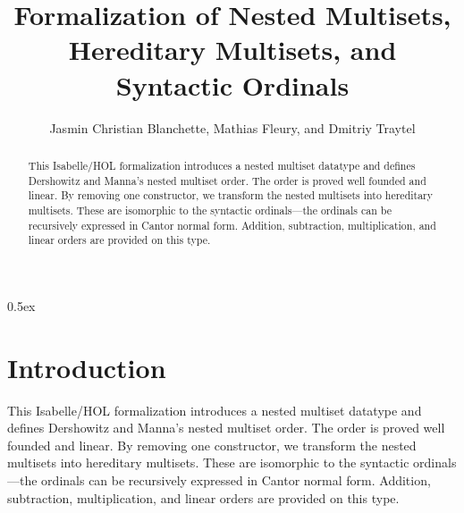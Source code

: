 \documentclass[10pt,a4paper]{article}
\begin{document}
\title{Formalization of Nested Multisets, Hereditary Multisets, and Syntactic Ordinals}
\author{Jasmin Christian Blanchette, Mathias Fleury, and Dmitriy Traytel}

\maketitle

\begin{abstract}
\noindent
This Isabelle/HOL formalization introduces a nested multiset datatype and
defines Dershowitz and Manna's nested multiset order. The order is proved well
founded and linear. By removing one constructor, we transform the nested
multisets into hereditary multisets. These are isomorphic to the syntactic
ordinals---the ordinals can be recursively expressed in Cantor normal form.
Addition, subtraction, multiplication, and linear orders are provided on this
type.
\end{abstract}

\tableofcontents

\parindent 0pt
\parskip 0.5ex

\section{Introduction}

This Isabelle/HOL formalization introduces a nested multiset datatype and
defines Dershowitz and Manna's nested multiset order. The order is proved well
founded and linear. By removing one constructor, we transform the nested
multisets into hereditary multisets. These are isomorphic to the syntactic
ordinals---the ordinals can be recursively expressed in Cantor normal form.
Addition, subtraction, multiplication, and linear orders are provided on this
type.




%
%

%
%
\end{document}
